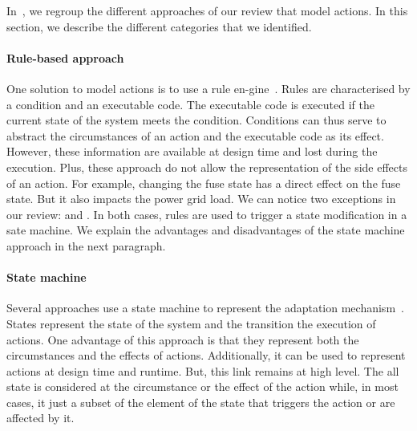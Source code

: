 In~, we regroup the different approaches of our review that model \glspl{action}.
In this section, we describe the different categories that we identified.

\paragraph{Rule-based approach}
One solution to model \glspl{action} is to use a rule en-\linebreak gine~\cite{DBLP:conf/icse/TaharaOH17, DBLP:conf/icse/ArcainiRS15, DBLP:conf/wrla/BruniCGLV12, DBLP:conf/eurosys/GraceHPBCT08, DBLP:conf/gpce/PintoFT03, DBLP:journals/computer/GarlanCHSS04}.
Rules are characterised by a condition and an executable code.
The executable code is executed if the current state of the system meets the condition.
Conditions can thus serve to abstract the \Glspl{circumstance} of an action and the executable code as its effect.
However, these information are available at design time and lost during the execution.
Plus, these approach do not allow the representation of the side effects of an action.
For example, changing the fuse state has a direct effect on the fuse state.
But it also impacts the power grid load.
We can notice two exceptions in our review: \cite{DBLP:conf/icse/TaharaOH17} and \cite{DBLP:conf/icse/ArcainiRS15}.
In both cases, rules are used to trigger a state modification in a sate machine.
We explain the advantages and disadvantages of the state machine approach in the next paragraph. 

\paragraph{State machine}
Several approaches use a state machine to represent the adaptation mechanism~\cite{DBLP:conf/icse/ArcainiRS15, DBLP:conf/icse/IftikharW14a, DBLP:conf/smartgridsec/0001FKNT14, DBLP:conf/sigsoft/MorenoCGS15, DBLP:conf/kbse/FilieriGLM11, DBLP:conf/wetice/DjoudiBZ14, DBLP:conf/aosd/ZhangGC09, DBLP:conf/icse/GhezziPST13, DBLP:conf/kbse/TajalliGEM10}.
States represent the state of the system and the transition the execution of \glspl{action}. 
One advantage of this approach is that they represent both the \glspl{circumstance} and the effects of actions.
Additionally, it can be used to represent actions at design time and runtime.
But, this link remains at high level.
The all state is considered at the circumstance or the effect of the action while, in most cases, it just a subset of the element of the state that triggers the action or are affected by it. 

